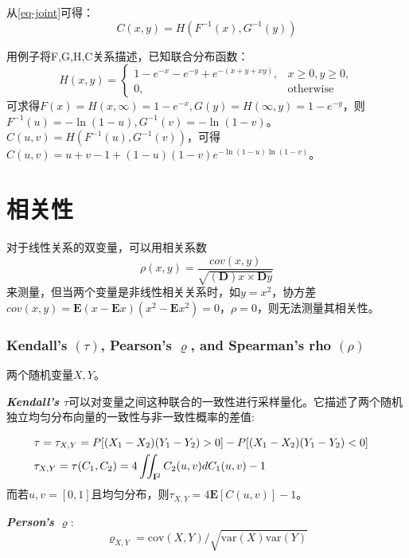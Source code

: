 \documentclass[UTF8]{ctexart}
\begin{document}
从\cref{eq-joint}可得：
\begin{equation}
    C(x,y) = H(F^{-1}(x),G^{-1}(y))
    \label{eq-copula}
\end{equation}

用例子将F,G,H,C关系描述，已知联合分布函数：
\begin{equation*}
    H(x,y)=
    \begin{cases}
        1-e^{-x}-e^{-y}+e^{-(x+y+xy)}, &x\geq0,y\geq0, \\
        0, &\text{otherwise}
    \end{cases}
\end{equation*}
可求得$F(x)=H(x,\infty) = 1-e^{-x},G(y)=H(\infty,y)=1-e^{-y}$，则$F^{-1}(u) = -\ln(1-u),G^{-1}(v)=-\ln(1-v)$。$C(u,v) = H(F^{-1}(u),G^{-1}(v))$，可得$C(u,v) = u+v-1+(1-u)(1-v)e^{-\ln(1-u)\ln(1-v)}$。


\section{相关性}
对于线性关系的双变量，可以用相关系数\[
    \rho(x,y) = \dfrac{cov(x,y)}{\sqrt{(\mathbf{D})x \times \mathbf{D}y}}
\]
来测量，但当两个变量是非线性相关关系时，如$y=x^2$，协方差$cov(x,y)=\mathbf{E}(x-\mathbf{E}x)(x^2-\mathbf{E}x^2) = 0$，$\rho=0$，则无法测量其相关性。




\subsubsection{Kendall's $(\tau)$, Pearson's $\varrho$, and Spearman's rho $(\rho)$}
两个随机变量$X,Y$。

\emph{\textbf{\textcolor[rgb]{1,0,0}{Kendall's $\tau$}}}可以对变量之间这种联合的一致性进行采样量化。它描述了两个随机独立均匀分布向量的一致性与非一致性概率的差值\cite{Montes2015}:

\begin{eqnarray}
    &\tau = \tau_{X,Y} = P[(X_1-X_2)(Y_1-Y_2) > 0] - P[(X_1-X_2)(Y_1-Y_2)<0]& \notag \\
    &\tau_{X,Y} = \tau(C_1,C_2) = 4\iint_{\mathbf{I}^2}C_2(u,v)dC_{1}(u,v)-1&
    \label{eq-tau}
\end{eqnarray}
而若$u,v = [0,1]$且均匀分布，则$\tau_{X,Y} = 4\mathbf{E}[C(u,v)]-1$。




\emph{\textbf{\textcolor[rgb]{1,0,0}{Person's $\varrho$}}}:
\begin{equation}   
    \label{eq-varrho}
    \varrho_{X,Y} = \text{cov}(X,Y)/\sqrt{\text{var}(X)\text{var}(Y)}
\end{equation}
\end{document}
